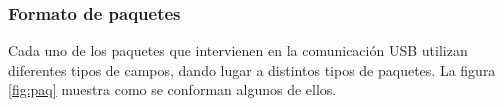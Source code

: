 %	
	
\subsubsection{Formato de paquetes}
	Cada uno de los paquetes que intervienen en la comunicación USB utilizan diferentes tipos de campos, dando lugar a distintos tipos de paquetes. La figura \ref{fig:paq} muestra como se conforman algunos de ellos.%

